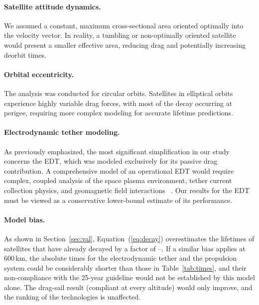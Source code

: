\documentclass[11pt,a4paper]{article}
\begin{document}
\paragraph{Satellite attitude dynamics.} We assumed a constant, maximum cross-sectional area oriented optimally into the velocity vector. In reality, a tumbling or non-optimally oriented satellite would present a smaller effective area, reducing drag and potentially increasing deorbit times.

\paragraph{Orbital eccentricity.} The analysis was conducted for circular orbits. Satellites in elliptical orbits experience highly variable drag forces, with most of the decay occurring at perigee, requiring more complex modeling for accurate lifetime predictions.

\paragraph{Electrodynamic tether modeling.} As previously emphasized, the most significant simplification in our study concerns the EDT, which was modeled exclusively for its passive drag contribution. A comprehensive model of an operational EDT would require complex, coupled analysis of the space plasma environment, tether current collection physics, and geomagnetic field interactions ~\cite{bilen,sarego,nasa2021}. Our results for the EDT must be viewed as a conservative lower-bound estimate of its performance.

\paragraph{Model bias.} As shown in Section~\ref{sec:val}, Equation~(\ref{eq:decay}) overestimates the lifetimes of satellites that have already decayed by a factor of \ValLo--\ValHi. If a similar bias applies at 600\,km, the absolute times for the electrodynamic tether and the propulsion system could be considerably shorter than those in Table~\ref{tab:times}, and their non-compliance with the 25-year guideline would not be established by this model alone. The drag-sail result (compliant at every altitude) would only improve, and the ranking of the technologies is unaffected.
\end{document}
